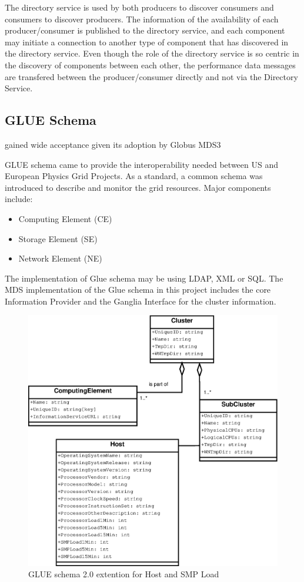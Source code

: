The directory service is used by both producers to discover consumers and consumers to discover producers. The information of the availability of each producer/consumer is published to the directory service, and each component may initiate a connection to another type of component that has discovered in the directory service. Even though the role of the directory service is so centric in the discovery of components between each other, the performance data messages are transfered between the producer/consumer directly and not via the Directory Service.

\subsection{GLUE Schema}
gained wide acceptance given its adoption by Globus MDS3

GLUE schema came to provide the interoperability needed between US and European Physics Grid Projects. As a standard, a common schema was introduced to describe and monitor the grid resources. Major components include:

\begin{itemize}
\item Computing Element (CE)
\item Storage Element (SE)
\item Network Element (NE)
\end{itemize}

The implementation of Glue schema may be using LDAP, XML or SQL. The MDS implementation of the Glue schema in this project includes the core Information Provider and the Ganglia Interface for the cluster information.


\begin{figure}[htb]
\centering
 \includegraphics[width=5in]{images/gluece_ext.eps}
\caption{GLUE schema 2.0 extention for Host and SMP Load}
\label{figure:gluece_ext}
\end{figure}



